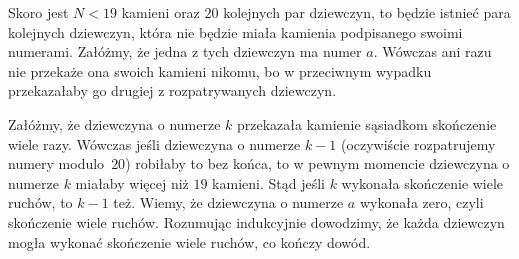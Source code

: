 \vspace{10px}
\noindent
Skoro jest $N < 19$ kamieni oraz $20$ kolejnych par dziewczyn, to będzie istnieć para kolejnych dziewczyn, która nie będzie miała kamienia podpisanego swoimi numerami. Załóżmy, że jedna z tych dziewczyn ma numer $a$. Wówczas ani razu nie przekaże ona swoich kamieni nikomu, bo w przeciwnym wypadku przekazałaby go drugiej z rozpatrywanych dziewczyn.


\vspace{10px}
\noindent
Załóżmy, że dziewczyna o numerze $k$ przekazała kamienie sąsiadkom skończenie wiele razy. Wówczas jeśli dziewczyna o numerze $k - 1$ (oczywiście rozpatrujemy numery modulo~$20$) robiłaby to bez końca, to w pewnym momencie dziewczyna o numerze $k$ miałaby więcej niż $19$ kamieni. Stąd jeśli $k$ wykonała skończenie wiele ruchów, to $k - 1$ też. Wiemy, że dziewczyna o numerze $a$ wykonała zero, czyli skończenie wiele ruchów. Rozumując indukcyjnie dowodzimy, że każda dziewczyn mogła wykonać skończenie wiele ruchów, co kończy dowód.
